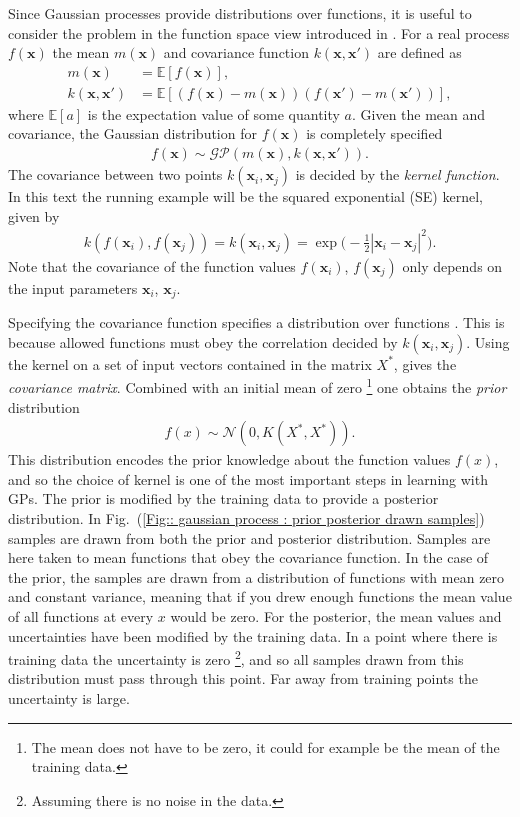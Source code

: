 \documentclass[twoside,english]{uiofysmaster}
\begin{document}
Since Gaussian processes provide distributions over functions, it is useful to consider the problem in the function space view introduced in \cite{rasmussen2006gaussian}. For a real process $f(\textbf{x})$ the mean  $m(\textbf{x})$ and covariance function $k(\textbf{x}, \textbf{x}')$ are defined as
\begin{align}
m(\textbf{x}) &= \mathbb{E}[f(\textbf{x})],\\
k(\textbf{x}, \textbf{x}') &= \mathbb{E} [(f(\textbf{x}) - m(\textbf{x}))(f(\textbf{x}') - m(\textbf{x}'))],
\end{align}
where $\mathbb{E}[a]$ is the expectation value of some quantity $a$. Given the mean and covariance, the Gaussian distribution for $f(\textbf{x})$ is completely specified
\begin{align}
f(\textbf{x}) \sim \mathcal{GP}(m(\textbf{x}), k(\textbf{x}, \textbf{x}')).
\end{align}
The covariance between two points $k(\textbf{x}_i, \textbf{x}_j)$ is decided by the \textit{kernel function}. In this text the running example will be the squared exponential (SE) kernel, given by
\begin{align}
k(f(\textbf{x}_i), f(\textbf{x}_j)) = k(\textbf{x}_i, \textbf{x}_j) = \exp \Big( - \frac{1}{2} |\textbf{x}_i - \textbf{x}_j|^2 \Big).
\end{align}
Note that the covariance of the function values $f(\textbf{x}_i)$, $f(\textbf{x}_j)$ only depends on the input parameters $\textbf{x}_i$, $\textbf{x}_j$. 

Specifying the covariance function specifies a distribution over functions \cite{rasmussen2006gaussian}. This is because allowed functions must obey the correlation decided by $k(\textbf{x}_i, \textbf{x}_j)$. Using the kernel on a set of input vectors contained in the matrix $X^*$, gives the \textit{covariance matrix}. Combined with an initial mean of zero \footnote{The mean does not have to be zero, it could for example be the mean of the training data.} one obtains the \textit{prior} distribution
\begin{align}
f(x) \sim \mathcal{N} (0, K(X^*, X^*)).
\end{align} 
This distribution encodes the prior knowledge about the function values $f(x)$, and so the choice of kernel is one of the most important steps in learning with GPs. The prior is modified by the training data to provide a posterior distribution. In Fig.\ (\ref{Fig:: gaussian process : prior posterior drawn samples}) samples are drawn from both the prior and posterior distribution. Samples are here taken to mean functions that obey the covariance function. In the case of the prior, the samples are drawn from a distribution of functions with mean zero and constant variance, meaning that if you drew enough functions the mean value of all functions at every $x$ would be zero. For the posterior, the mean values and uncertainties have been modified by the training data. In a point where there is training data the uncertainty is zero \footnote{Assuming there is no noise in the data.}, and so all samples drawn from this distribution must pass through this point. Far away from training points the uncertainty is large.
\end{document}
